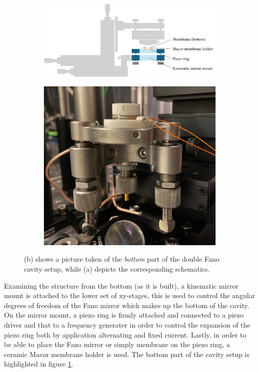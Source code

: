 \begin{figure}[h!]
    \centering
    \begin{subfigure}[b]{0.6\textwidth}
        \includegraphics[width=\textwidth]{figures/setup_bottom.pdf}
        \caption{}
        \label{fig:setup_bottom}
    \end{subfigure}
    \begin{subfigure}[b]{0.3\textwidth}
        \includegraphics[width=\textwidth]{figures/cavity_setup_bottom_pic.pdf}
        \caption{}
        \label{fig:setup_bottom_pic}
    \end{subfigure}
    \caption{(b) shows a picture taken of the \emph{bottom} part of the double Fano cavity setup, while (a) depicts the corresponding schematics.}
    \label{fig:setup_bottom_sketch_and_pic}
\end{figure}

Examining the structure from the bottom (as it is built), a kinematic mirror mount is attached to the lower set of xy-stages, this is used to control the angular degrees of freedom of the Fano mirror which makes up the bottom of the cavity. On the mirror mount, a piezo ring is firmly attached and connected to a piezo driver and that to a frequency generater in order to control the expansion of the piezo ring both by application alternating and fixed current. Lastly, in order to be able to place the Fano mirror or simply membrane on the  piezo ring, a ceramic Macor membrane holder is used. The bottom part of the cavity setup is highlighted in figure \ref{fig:setup_bottom}.

